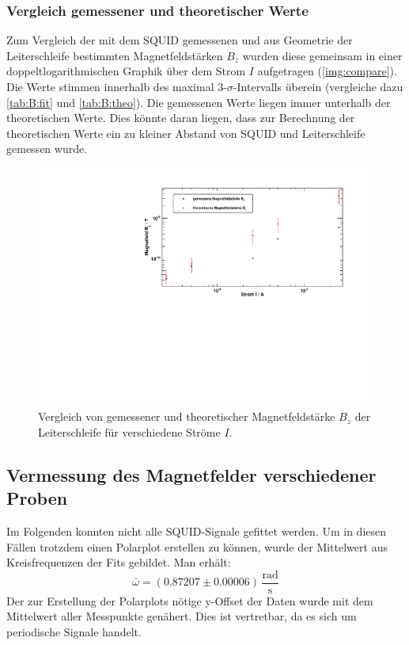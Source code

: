 \subsubsection{Vergleich gemessener und theoretischer Werte}
Zum Vergleich der mit dem SQUID gemessenen und aus Geometrie der Leiterschleife bestimmten Magnetfeldstärken $B_z$ wurden diese gemeinsam 
in einer doppeltlogarithmischen Graphik über dem Strom $I$ aufgetragen (\autoref{img:compare}). Die Werte stimmen innerhalb des 
maximal 3-$\sigma$-Intervalls überein (vergleiche dazu \autoref{tab:B:fit} und \autoref{tab:B:theo}). Die gemessenen Werte liegen immer unterhalb 
der theoretischen Werte. Dies könnte daran liegen, dass zur Berechnung der theoretischen Werte ein zu kleiner Abstand von SQUID und Leiterschleife 
gemessen wurde.
\begin{figure}[H]
\begin{center}
  \includegraphics[width=\textwidth]{../img/compare_loglog.pdf}
  \caption{Vergleich von gemessener und theoretischer Magnetfeldstärke $B_z$ der Leiterschleife für verschiedene Ströme $I$.}
  \label{img:compare}
\end{center}
\end{figure}

\subsection{Vermessung des Magnetfelder verschiedener Proben}
Im Folgenden konnten nicht alle SQUID-Signale gefittet werden. Um in diesen Fällen trotzdem einen Polarplot erstellen zu können, wurde der 
Mittelwert aus Kreisfrequenzen der Fits gebildet. Man erhält:
\begin{equation}
  \bar{\omega} = (0.87207 \pm 0.00006) \, \frac{\text{rad}}{\text{s}}
\end{equation}
Der zur Erstellung der Polarplots nötige y-Offset der Daten wurde mit dem Mittelwert aller Messpunkte genähert. Dies ist vertretbar, da es sich 
um periodische Signale handelt.

